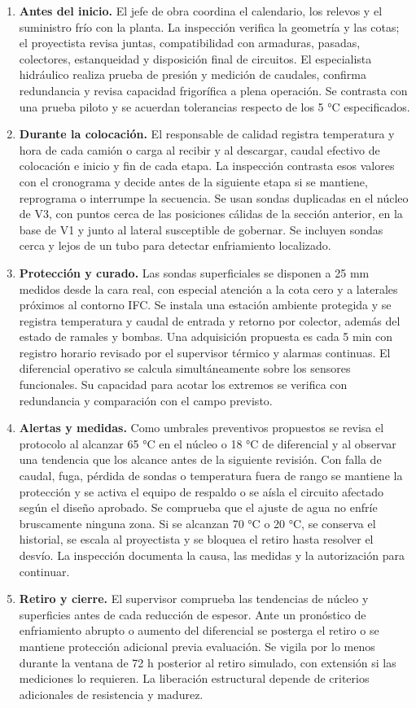 \documentclass[11pt,a4paper]{article}
\begin{document}
\begin{enumerate}
\item \textbf{Antes del inicio.} El jefe de obra coordina el calendario, los relevos y el suministro frío con la planta. La inspección verifica la geometría y las cotas; el proyectista revisa juntas, compatibilidad con armaduras, pasadas, colectores, estanqueidad y disposición final de circuitos. El especialista hidráulico realiza prueba de presión y medición de caudales, confirma redundancia y revisa capacidad frigorífica a plena operación. Se contrasta con una prueba piloto y se acuerdan tolerancias respecto de los 5 °C especificados.
\item \textbf{Durante la colocación.} El responsable de calidad registra temperatura y hora de cada camión o carga al recibir y al descargar, caudal efectivo de colocación e inicio y fin de cada etapa. La inspección contrasta esos valores con el cronograma y decide antes de la siguiente etapa si se mantiene, reprograma o interrumpe la secuencia. Se usan sondas duplicadas en el núcleo de V3, con puntos cerca de las posiciones cálidas de la sección anterior, en la base de V1 y junto al lateral susceptible de gobernar. Se incluyen sondas cerca y lejos de un tubo para detectar enfriamiento localizado.
\item \textbf{Protección y curado.} Las sondas superficiales se disponen a 25 mm medidos desde la cara real, con especial atención a la cota cero y a laterales próximos al contorno IFC. Se instala una estación ambiente protegida y se registra temperatura y caudal de entrada y retorno por colector, además del estado de ramales y bombas. Una adquisición propuesta es cada 5 min con registro horario revisado por el supervisor térmico y alarmas continuas. El diferencial operativo se calcula simultáneamente sobre los sensores funcionales. Su capacidad para acotar los extremos se verifica con redundancia y comparación con el campo previsto.
\item \textbf{Alertas y medidas.} Como umbrales preventivos propuestos se revisa el protocolo al alcanzar 65 °C en el núcleo o 18 °C de diferencial y al observar una tendencia que los alcance antes de la siguiente revisión. Con falla de caudal, fuga, pérdida de sondas o temperatura fuera de rango se mantiene la protección y se activa el equipo de respaldo o se aísla el circuito afectado según el diseño aprobado. Se comprueba que el ajuste de agua no enfríe bruscamente ninguna zona. Si se alcanzan 70 °C o 20 °C, se conserva el historial, se escala al proyectista y se bloquea el retiro hasta resolver el desvío. La inspección documenta la causa, las medidas y la autorización para continuar.
\item \textbf{Retiro y cierre.} El supervisor comprueba las tendencias de núcleo y superficies antes de cada reducción de espesor. Ante un pronóstico de enfriamiento abrupto o aumento del diferencial se posterga el retiro o se mantiene protección adicional previa evaluación. Se vigila por lo menos durante la ventana de 72 h posterior al retiro simulado, con extensión si las mediciones lo requieren. La liberación estructural depende de criterios adicionales de resistencia y madurez.
\end{enumerate}
\end{document}

